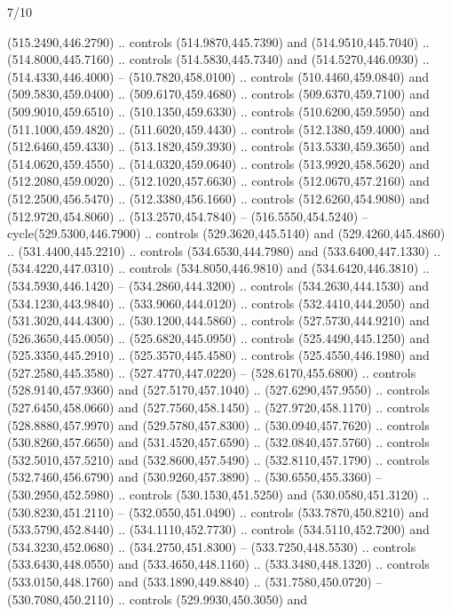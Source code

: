 \begin{flagdescription}{7/10}
\begin{scope}[xshift=0.5\flaglength]
\begin{scope}[scale=0.00185\flagwidth,yshift=245mm,xshift=-43.7mm]
\begin{scope}[y=-0.8pt, x=0.8pt, inner sep=0pt, outer sep=0pt]
\begin{scope}[shift={(-344.0678,183.89831)},fill=brown]
  (515.2490,446.2790) .. controls (514.9870,445.7390) and (514.9510,445.7040) ..
  (514.8000,445.7160) .. controls (514.5830,445.7340) and (514.5270,446.0930) ..
  (514.4330,446.4000) -- (510.7820,458.0100) .. controls (510.4460,459.0840) and
  (509.5830,459.0400) .. (509.6170,459.4680) .. controls (509.6370,459.7100) and
  (509.9010,459.6510) .. (510.1350,459.6330) .. controls (510.6200,459.5950) and
  (511.1000,459.4820) .. (511.6020,459.4430) .. controls (512.1380,459.4000) and
  (512.6460,459.4330) .. (513.1820,459.3930) .. controls (513.5330,459.3650) and
  (514.0620,459.4550) .. (514.0320,459.0640) .. controls (513.9920,458.5620) and
  (512.2080,459.0020) .. (512.1020,457.6630) .. controls (512.0670,457.2160) and
  (512.2500,456.5470) .. (512.3380,456.1660) .. controls (512.6260,454.9080) and
  (512.9720,454.8060) .. (513.2570,454.7840) -- (516.5550,454.5240) --
  cycle(529.5300,446.7900) .. controls (529.3620,445.5140) and
  (529.4260,445.4860) .. (531.4400,445.2210) .. controls (534.6530,444.7980) and
  (533.6400,447.1330) .. (534.4220,447.0310) .. controls (534.8050,446.9810) and
  (534.6420,446.3810) .. (534.5930,446.1420) -- (534.2860,444.3200) .. controls
  (534.2630,444.1530) and (534.1230,443.9840) .. (533.9060,444.0120) .. controls
  (532.4410,444.2050) and (531.3020,444.4300) .. (530.1200,444.5860) .. controls
  (527.5730,444.9210) and (526.3650,445.0050) .. (525.6820,445.0950) .. controls
  (525.4490,445.1250) and (525.3350,445.2910) .. (525.3570,445.4580) .. controls
  (525.4550,446.1980) and (527.2580,445.3580) .. (527.4770,447.0220) --
  (528.6170,455.6800) .. controls (528.9140,457.9360) and (527.5170,457.1040) ..
  (527.6290,457.9550) .. controls (527.6450,458.0660) and (527.7560,458.1450) ..
  (527.9720,458.1170) .. controls (528.8880,457.9970) and (529.5780,457.8300) ..
  (530.0940,457.7620) .. controls (530.8260,457.6650) and (531.4520,457.6590) ..
  (532.0840,457.5760) .. controls (532.5010,457.5210) and (532.8600,457.5490) ..
  (532.8110,457.1790) .. controls (532.7460,456.6790) and (530.9260,457.3890) ..
  (530.6550,455.3360) -- (530.2950,452.5980) .. controls (530.1530,451.5250) and
  (530.0580,451.3120) .. (530.8230,451.2110) -- (532.0550,451.0490) .. controls
  (533.7870,450.8210) and (533.5790,452.8440) .. (534.1110,452.7730) .. controls
  (534.5110,452.7200) and (534.3230,452.0680) .. (534.2750,451.8300) --
  (533.7250,448.5530) .. controls (533.6430,448.0550) and (533.4650,448.1160) ..
  (533.3480,448.1320) .. controls (533.0150,448.1760) and (533.1890,449.8840) ..
  (531.7580,450.0720) -- (530.7080,450.2110) .. controls (529.9930,450.3050) and

\end{scope}
\end{scope}
\end{scope}
\end{scope}
\end{flagdescription}
